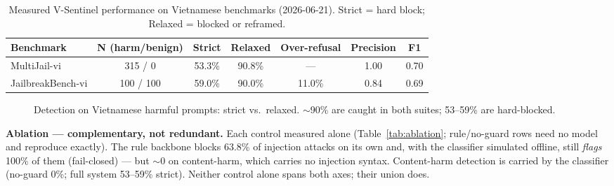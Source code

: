 \documentclass[11pt, a4paper]{article}
\begin{document}
\begin{table}[H]
    \centering
    \caption{Measured V-Sentinel performance on Vietnamese benchmarks (2026-06-21). Strict = hard block; Relaxed = blocked or reframed.}
    \label{tab:results}
    \begin{tabularx}{\textwidth}{l c c c c c c}
        \toprule
        \textbf{Benchmark} & \textbf{N (harm/benign)} & \textbf{Strict} & \textbf{Relaxed} & \textbf{Over-refusal} & \textbf{Precision} & \textbf{F1} \\
        \midrule
        MultiJail-vi      & 315 / 0   & 53.3\% & 90.8\% & ---    & 1.00 & 0.70 \\
        JailbreakBench-vi & 100 / 100 & 59.0\% & 90.0\% & 11.0\% & 0.84 & 0.69 \\
        \bottomrule
    \end{tabularx}
\end{table}

\begin{figure}[H]
\centering
{}
\caption{Detection on Vietnamese harmful prompts: strict vs.\ relaxed. $\sim$90\% are caught in both suites; 53--59\% are hard-blocked.}
\label{fig:detection}
\end{figure}

\noindent\textbf{Ablation --- complementary, not redundant.} Each control measured alone (Table~\ref{tab:ablation}; rule/no-guard rows need no model and reproduce exactly). The rule backbone blocks 63.8\% of injection attacks on its own and, with the classifier simulated offline, still \emph{flags} 100\% of them (fail-closed) --- but $\sim$0 on content-harm, which carries no injection syntax. Content-harm detection is carried by the classifier (no-guard 0\%; full system 53--59\% strict). Neither control alone spans both axes; their union does.
\end{document}
